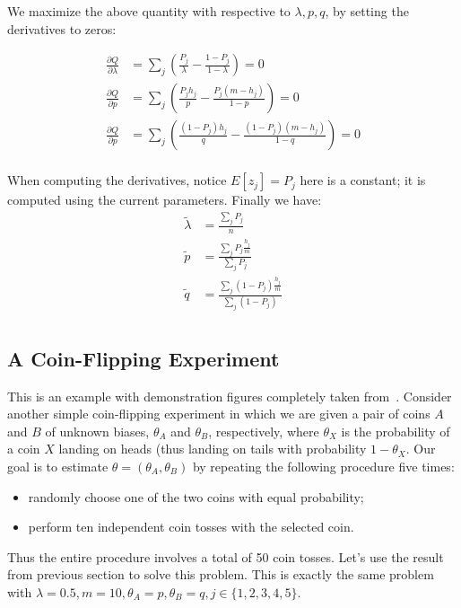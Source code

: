 \documentclass{article}  %
\begin{document}
\begin{itemize}
We maximize the above quantity with respective to $\lambda,p,q$, by setting the derivatives to zeros:

\begin{align*}
\frac{\partial Q}{\partial \lambda} &= \sum_j \left( \frac{P_j}{\lambda} -
\frac{1-P_j}{1-\lambda} \right) = 0 \\
\frac{\partial Q}{\partial p} &= \sum_j \left( \frac{P_jh_j}{p} -
\frac{P_j(m-h_j)}{1-p} \right) = 0 \\
\frac{\partial Q}{\partial p} &= \sum_j \left( \frac{(1-P_j)h_j}{q} -
\frac{(1-P_j)(m-h_j)}{1-q} \right) = 0 \\
\end{align*}

When computing the derivatives, notice $E[z_j]=P_j$ here is a constant; it is
computed using the current parameters. Finally we have:
\begin{align*}
\tilde \lambda &= \frac{\sum_j P_j}{n}\\
\tilde p &= \frac{\sum_j P_j\frac{h_j}{m}}{\sum_j P_j}\\
\tilde q &= \frac{\sum_j (1-P_j)\frac{h_j}{m}}{\sum_j (1-P_j)}\\
\end{align*}

\end{itemize}

\subsection{A Coin-Flipping Experiment}

This is an example with demonstration figures completely taken from~\cite{nature}. Consider another simple coin-flipping experiment in which we are given a pair of coins $A$ and $B$ of unknown biases, $\theta_A$ and $\theta_B$, respectively, where $\theta_X$ is the probability of a coin $X$ landing on heads (thus landing on tails with probability $1-\theta_X$. Our goal is to estimate $\theta = (\theta_A, \theta_B)$ by repeating the following procedure five times: 

\begin{itemize}
\item randomly choose one of the two coins with equal probability;
\item perform ten independent coin tosses with the selected coin.
\end{itemize}

Thus the entire procedure involves a total of 50 coin tosses. Let's use the
result from previous section to solve this problem. This is exactly the same problem with $\lambda = 0.5, m=10, \theta_A = p, \theta_B = q,  j \in \{1,2,3,4,5\}$.
\end{document}
